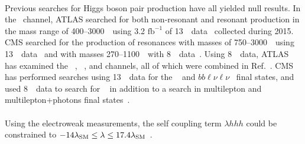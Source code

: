 \paragraph{}
Previous searches for Higgs boson pair production have all yielded null results. In the \bbbb~channel, ATLAS searched for both non-resonant and resonant production in the mass range of 400--3000~\GeV\ using 3.2 $\mathrm{fb}^{-1}$ of 13~\TeV\ data~\cite{EXOT-2015-11} collected during 2015. CMS searched for the production of resonances with masses of 750--3000~\GeV\ using 13~\TeV\ data~\cite{CMS-B2G-16-026} and with masses 270--1100~\GeV\ with 8~\TeV\ data~\cite{CMS-HIG-14-013}. Using 8~\TeV\ data, ATLAS has examined the \bbbb~\cite{Aad:2015uka}, \bbgg~\cite{HIGG-2013-29}, \bbtautau and \WWgg channels, all of which were combined in Ref.~\cite{HIGG-2013-33}. CMS has performed searches using 13~\TeV\ data for the \bbtautau~\cite{CMS-HIG-17-002} and $bb\ell\nu\ell\nu$~\cite{CMSHIG17006} final states, and used 8~\TeV\ data to search for \bbgg~\cite{Khachatryan:2016sey} in addition to a search in multilepton and multilepton+photons final states~\cite{Khachatryan:2014jya}.

\paragraph{}
Using the electroweak measurements, the self coupling term $\lambda hhh$ could be constrained to $-14 \lambda_{\rm SM} \leq \lambda \leq 17.4 \lambda_{\rm SM}$~\cite{Kribs:2017znd}.

